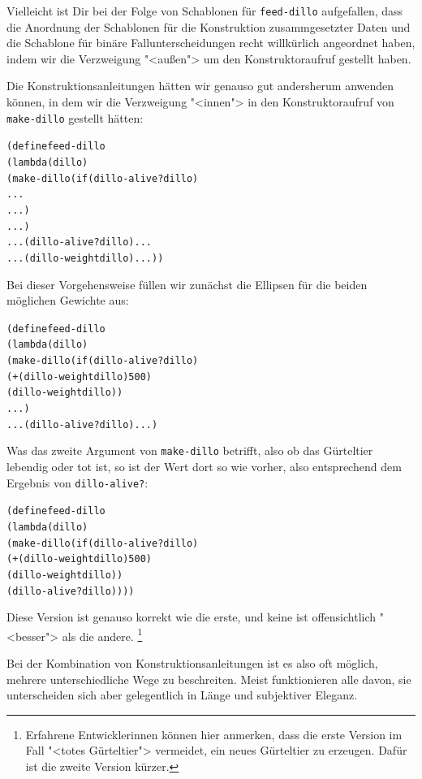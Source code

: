 Vielleicht ist Dir bei der Folge von Schablonen für
\texttt{feed-dillo} aufgefallen, dass die Anordnung der Schablonen für
die Konstruktion zusammgesetzter Daten und die Schablone für binäre
Fallunterscheidungen recht willkürlich angeordnet haben, indem wir die
Verzweigung "<außen"> um den Konstruktoraufruf gestellt haben.

Die Konstruktionsanleitungen hätten wir genauso gut andersherum
anwenden können, in dem wir die Verzweigung "<innen"> in den
Konstruktoraufruf von \texttt{make-dillo} gestellt hätten:
%
\begin{alltt}
(define feed-dillo
  (lambda (dillo)
    (make-dillo (if (dillo-alive? dillo)
                    ...
                    ...)
                ...)
   ... (dillo-alive? dillo) ...
   ... (dillo-weight dillo) ...))
\end{alltt}
%
Bei dieser Vorgehensweise füllen wir zunächst die Ellipsen für die
beiden möglichen Gewichte aus:
%
\begin{alltt}
(define feed-dillo
  (lambda (dillo)
    (make-dillo (if (dillo-alive? dillo)
                    (+ (dillo-weight dillo) 500)
                    (dillo-weight dillo))
                ...)
   ... (dillo-alive? dillo) ...)
\end{alltt}
%
Was das zweite Argument von \texttt{make-dillo} betrifft, also ob das
Gürteltier lebendig oder tot ist, so ist der Wert dort so wie
vorher, also entsprechend dem Ergebnis von \texttt{dillo-alive?}:
%
\begin{alltt}
(define feed-dillo
  (lambda (dillo)
    (make-dillo (if (dillo-alive? dillo)
                    (+ (dillo-weight dillo) 500)
                    (dillo-weight dillo))
                (dillo-alive? dillo))))
\end{alltt}
%
Diese Version ist genauso korrekt wie die erste, und keine ist
offensichtlich "<besser"> als die andere. \footnote{Erfahrene
Entwicklerinnen können hier anmerken, dass die erste Version im Fall
  "<totes Gürteltier"> vermeidet, ein neues Gürteltier zu erzeugen.
  Dafür ist die zweite Version kürzer.}

Bei der Kombination von Konstruktionsanleitungen ist es also oft
möglich, mehrere unterschiedliche Wege zu beschreiten.  Meist
funktionieren alle davon, sie unterscheiden sich aber gelegentlich in
Länge und subjektiver Eleganz.

